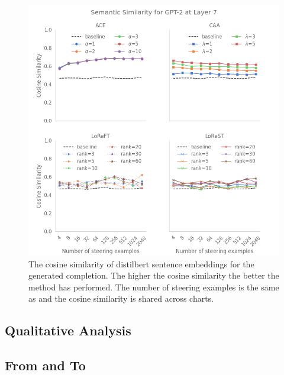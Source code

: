 \begin{figure}
    \centering
    \captionsetup{width=.9\textwidth}
    \includegraphics[width=\textwidth]{figures/gpt2_7_similarity.png}
    \caption{
        The cosine similarity of distilbert \citep{distilbert} sentence embeddings for the generated completion.
        The higher the cosine similarity the better the method has performed.
        The number of steering examples is the same as  and the cosine similarity is shared across charts.
    }
    \label{fig:gpt-pp-sim}
\end{figure}

\subsection{Qualitative Analysis}

\subsection{From and To}
